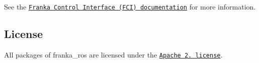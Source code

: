 \href{https://travis-ci.org/frankaemika/franka_ros}{\tt }

See the \href{https://frankaemika.github.io/docs}{\tt Franka Control Interface (F\+CI) documentation} for more information.

\subsection*{License}

All packages of {\ttfamily franka\+\_\+ros} are licensed under the \href{https://www.apache.org/licenses/LICENSE-2.0.html}{\tt Apache 2. license}. 
